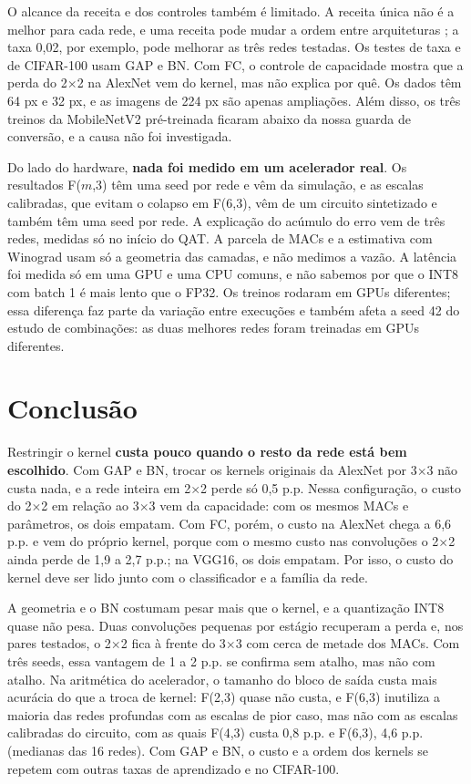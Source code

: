 \documentclass[conference]{IEEEtran}
\newcommand{\by}{\ensuremath{\times}}
\begin{document}
O alcance da receita e dos controles também é limitado. A receita única não é a melhor para cada rede, e uma receita pode mudar a ordem entre arquiteturas \cite{bello2021revisiting,wightman2021resnet}; a taxa 0,02, por exemplo, pode melhorar as três redes testadas. Os testes de taxa e de CIFAR-100 usam GAP e BN. Com FC, o controle de capacidade mostra que a perda do 2\by2 na AlexNet vem do kernel, mas não explica por quê. Os dados têm 64 px e 32 px, e as imagens de 224 px são apenas ampliações. Além disso, os três treinos da MobileNetV2 pré-treinada ficaram abaixo da nossa guarda de conversão, e a causa não foi investigada.

Do lado do hardware, \textbf{nada foi medido em um acelerador real}. Os resultados F($m$,3) têm uma seed por rede e vêm da simulação, e as escalas calibradas, que evitam o colapso em F(6,3), vêm de um circuito sintetizado e também têm uma seed por rede. A explicação do acúmulo do erro vem de três redes, medidas só no início do QAT. A parcela de MACs e a estimativa com Winograd usam só a geometria das camadas, e não medimos a vazão. A latência foi medida só em uma GPU e uma CPU comuns, e não sabemos por que o INT8 com batch 1 é mais lento que o FP32. Os treinos rodaram em GPUs diferentes; essa diferença faz parte da variação entre execuções e também afeta a seed 42 do estudo de combinações: as duas melhores redes foram treinadas em GPUs diferentes.

\section{Conclusão}

Restringir o kernel \textbf{custa pouco quando o resto da rede está bem escolhido}. Com GAP e BN, trocar os kernels originais da AlexNet por 3\by3 não custa nada, e a rede inteira em 2\by2 perde só 0,5 p.p. Nessa configuração, o custo do 2\by2 em relação ao 3\by3 vem da capacidade: com os mesmos MACs e parâmetros, os dois empatam. Com FC, porém, o custo na AlexNet chega a 6,6 p.p. e vem do próprio kernel, porque com o mesmo custo nas convoluções o 2\by2 ainda perde de 1,9 a 2,7 p.p.; na VGG16, os dois empatam. Por isso, o custo do kernel
deve ser lido junto com o classificador e a família da rede.

A geometria e o BN costumam pesar mais que o kernel, e a quantização INT8 quase não pesa. Duas convoluções pequenas por estágio recuperam a perda e, nos pares testados, o 2\by2 fica à frente do 3\by3 com cerca de metade dos MACs. Com três seeds, essa vantagem de 1 a 2 p.p. se confirma sem atalho, mas não com atalho. Na aritmética do acelerador, o tamanho do bloco de saída custa mais acurácia do que a troca de kernel: F(2,3) quase não custa, e F(6,3) inutiliza a maioria das redes profundas com as escalas de pior caso, mas não com as escalas calibradas do circuito, com as quais F(4,3) custa 0,8 p.p. e F(6,3), 4,6 p.p. (medianas das 16 redes). Com GAP e BN, o custo e a ordem dos kernels se repetem com outras taxas de aprendizado e no CIFAR-100.
\end{document}
